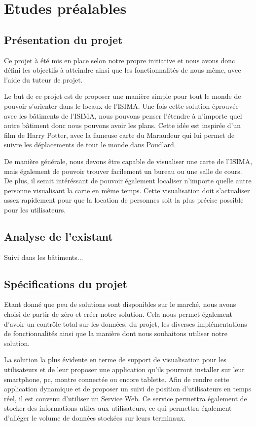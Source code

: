 \section{Etudes préalables}

\subsection{Présentation du projet}

Ce projet à été mis en place selon notre propre initiative et nous avons donc défini les objectifs à atteindre ainsi que les fonctionnalités de nous même, avec l'aide du tuteur de projet.

Le but de ce projet est de proposer une manière simple pour tout le monde de pouvoir s'orienter dans le locaux de l'ISIMA. Une fois cette solution éprouvée avec les bâtiments de l'ISIMA, nous pouvons penser l'étendre à n'importe quel autre bâtiment donc nous pouvons avoir les plans. Cette idée est inspirée d'un film de Harry Potter, avec la fameuse carte du Maraudeur qui lui permet de suivre les déplacements de tout le monde dans Poudlard.

De manière générale, nous devons être capable de visualiser une carte de l'ISIMA, mais également de pouvoir trouver facilement un bureau ou une salle de cours. De plus, il serait intéréssant de pouvoir également localiser n'importe quelle autre personne visualisant la carte en même temps.
Cette visualisation doit s'actualiser assez rapidement pour que la location de personnes soit la plus précise possible pour les utilisateurs.

\subsection{Analyse de l'existant}

Suivi dans les bâtiments...

\subsection{Spécifications du projet}

Etant donné que peu de solutions sont disponibles sur le marché, nous avons choisi de partir de zéro et créer notre solution. Cela nous permet également d'avoir un contrôle total sur les données, du projet, les diverses implémentations de fonctionnalités ainsi que la manière dont nous souhaitons utiliser notre solution.

La solution la plus évidente en terme de support de visualisation pour les utilisateurs et de leur proposer une application qu'ils pourront installer sur leur smartphone, pc, montre connectée ou encore tablette.
Afin de rendre cette application dynamique et de proposer un suivi de position d'utilisateurs en temps réel, il est convenu d'utiliser un Service Web. Ce service permettra également de stocker des informations utiles aux utilisateurs, ce qui permettra également d'alléger le volume de données stockées sur leurs terminaux.

